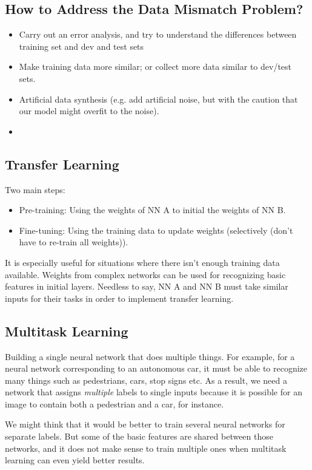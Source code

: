 \subsection{How to Address the Data Mismatch Problem?}
\begin{itemize}
    \item Carry out an error analysis, and try to understand the differences between training set and dev and test sets
    \item Make training data more similar; or collect more data similar to dev/test sets. 
    \item Artificial data synthesis (e.g. add artificial noise, but with the caution that our model might overfit to the noise).
    \item  
\end{itemize}

\subsection{Transfer Learning}
Two main steps: 
\begin{itemize}
    \item Pre-training: Using the weights of NN A to initial the weights of NN B. 
    \item Fine-tuning: Using the training data to update weights (selectively (don't have to re-train all weights)).  
\end{itemize}

It is especially useful for situations where there isn't enough training data available. Weights 
from complex networks can be used for recognizing basic features in initial layers. 
Needless to say, NN A and NN B must take similar inputs for their tasks in order to implement transfer learning. 

\subsection{Multitask Learning}
Building a single neural network that does multiple things. For example, for a 
neural network corresponding to an autonomous car, it must be able to recognize many things such as
pedestrians, cars, stop signs etc. As a result, we need a network that assigns \emph{multiple} labels
to single inputs because it is possible for an image to contain both a pedestrian and a car, for instance.

We might think that it would be better to train several neural networks for separate labels. But some 
of the basic features are shared between those networks, and it does not make sense to train 
multiple ones when multitask learning can even yield better results. 

